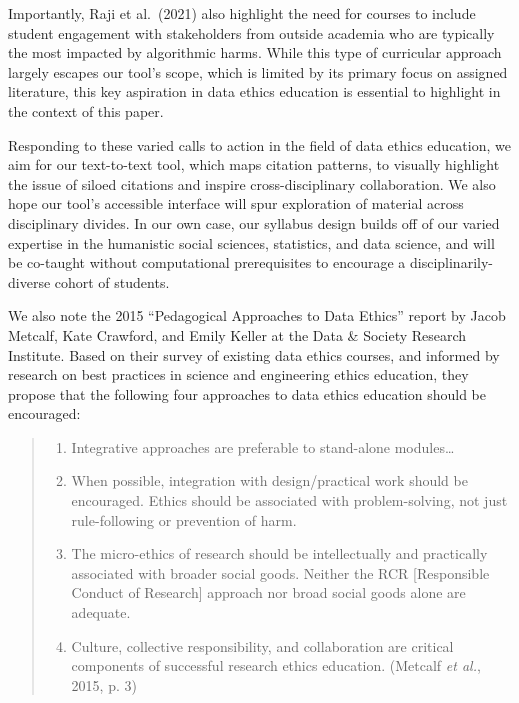 \documentclass[
]{article}
\providecommand{\tightlist}{%
  \setlength{\itemsep}{0pt}\setlength{\parskip}{0pt}}
\begin{document}
Importantly, Raji et al.~(2021) also highlight the need for courses to
include student engagement with stakeholders from outside academia who
are typically the most impacted by algorithmic harms. While this type of
curricular approach largely escapes our tool's scope, which is limited
by its primary focus on assigned literature, this key aspiration in data
ethics education is essential to highlight in the context of this paper.

Responding to these varied calls to action in the field of data ethics
education, we aim for our text-to-text tool, which maps citation
patterns, to visually highlight the issue of siloed citations and
inspire cross-disciplinary collaboration. We also hope our tool's
accessible interface will spur exploration of material across
disciplinary divides. In our own case, our syllabus design builds off of
our varied expertise in the humanistic social sciences, statistics, and
data science, and will be co-taught without computational prerequisites
to encourage a disciplinarily-diverse cohort of students.

We also note the 2015 ``Pedagogical Approaches to Data Ethics'' report
by Jacob Metcalf, Kate Crawford, and Emily Keller at the Data \& Society
Research Institute. Based on their survey of existing data ethics
courses, and informed by research on best practices in science and
engineering ethics education, they propose that the following four
approaches to data ethics education should be encouraged:

\begin{quote}
\begin{enumerate}
\def\labelenumi{\arabic{enumi})}
\tightlist
\item
  Integrative approaches are preferable to stand-alone modules\ldots{}
\item
  When possible, integration with design/practical work should be
  encouraged. Ethics should be associated with problem-solving, not just
  rule-following or prevention of harm.
\item
  The micro-ethics of research should be intellectually and practically
  associated with broader social goods. Neither the RCR {[}Responsible
  Conduct of Research{]} approach nor broad social goods alone are
  adequate.
\item
  Culture, collective responsibility, and collaboration are critical
  components of successful research ethics education. (Metcalf \emph{et
  al.}, 2015, p. 3)
\end{enumerate}
\end{quote}
\end{document}
